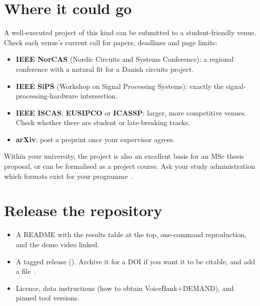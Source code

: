 \section{Where it could go}\label{sec:writeup:venues}

A well-executed project of this kind can be submitted to a student-friendly
venue. Check each venue's current call for papers, deadlines and page limits:
\begin{itemize}
  \item \textbf{IEEE NorCAS} (Nordic Circuits and Systems Conference): a
        regional conference with a natural fit for a Danish circuits project.
  \item \textbf{IEEE SiPS} (Workshop on Signal Processing Systems): exactly the
        signal-processing-hardware intersection.
  \item \textbf{IEEE ISCAS}, \textbf{EUSIPCO} or \textbf{ICASSP}: larger, more
        competitive venues. Check whether there are student or late-breaking
        tracks.
  \item \textbf{arXiv}: post a preprint once your supervisor agrees.
\end{itemize}
Within your university, the project is also an excellent basis for an MSc
thesis proposal, or can be formalised as a project course. Ask your study
administration which formats exist for your programme~\cite{ch12-13:dtuprojectcourses}.

\section{Release the repository}\label{sec:writeup:release}

\begin{itemize}
  \item A README with the results table at the top, one-command reproduction,
        and the demo video linked.
  \item A tagged release (). Archive it for a DOI if you want it to
        be citable, and add a  file~\cite{ch12-13:githubcitation}.
  \item Licence, data instructions (how to obtain VoiceBank+DEMAND), and pinned
        tool versions.
\end{itemize}


